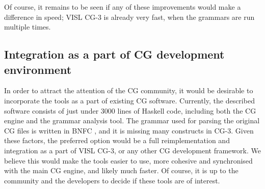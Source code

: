 {{Of course, it remains to be seen if any of these improvements would make a difference in speed; VISL CG-3 is already very fast, when the grammars are run multiple times.


\subsection{Integration as a part of CG development environment}

In order to attract the attention of the CG community, it would be desirable to incorporate the tools as a part of existing CG software. 
Currently, the described software consists of just under 3000 lines of Haskell code, including both the CG engine and the grammar analysis tool.
The grammar used for parsing the original CG files is written in BNFC \cite{bnfc}, and it is missing many constructs in CG-3. 
Given these factors, the preferred option would be a full reimplementation and integration as a part of VISL CG-3, or any other CG development framework. We believe this would make the tools easier to use, more cohesive and synchronised with the main CG engine, and likely much faster. Of course, it is up to the community and the developers to decide if these tools are of interest.










}}
